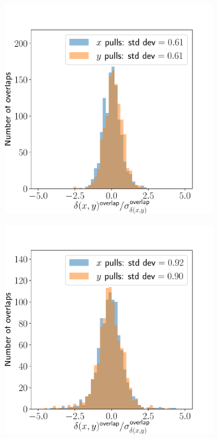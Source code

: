 \documentclass{article}
\begin{document}
\begin{figure}[ht]
\begin{subfigure}{0.24\linewidth}
		\caption{}
		\label{fig:stitchpull31}
	\end{subfigure}
	\begin{subfigure}{0.24\linewidth}
		\includegraphics[width=\linewidth]{stitch-pull-2-1.pdf}
		\caption{}
		\label{fig:stitchpull21}
	\end{subfigure}
	\begin{subfigure}{0.24\linewidth}
		\includegraphics[width=\linewidth]{stitch-pull-1-1.pdf}

\end{subfigure}
\end{figure}
\end{document}
